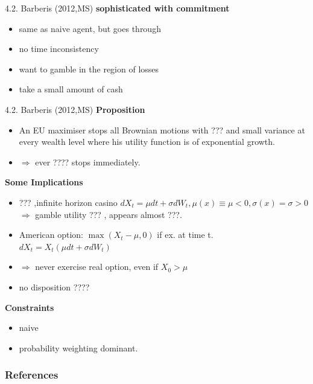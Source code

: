 \documentclass[11pt, aspectratio=169]{beamer}
\begin{document}
\begin{frame}{4.2. Barberis (2012,MS)}
    \textbf{sophisticated with commitment}
    \begin{itemize}
        \item same as naive agent, but goes through \medskip
        \item no time inconsistency \medskip
        \item want to gamble in the region of losses\\
        \item take a small amount of cash
    \end{itemize}
\end{frame}

\begin{frame}{4.2. Barberis (2012,MS)}
    \textbf{Proposition}    
    \begin{itemize}
        \item An EU maximiser stops all Brownian motions with  ??? and small variance at every wealth level where his utility function is of exponential growth.\\ 
        \item $\Rightarrow$ ever ???? stops immediately.\\
    \end{itemize}
    \textbf{Some Implications}    
    \begin{itemize}
        \item ??? ,infinite horizon casino \medskip
        $dX_t=\mu dt+ \sigma dW_t, \mu(x)\equiv \mu <0, \sigma(x)=\sigma >0 $\\
        $\Rightarrow $ gamble utility ??? , appears almost  ???.\\
        \item American option: $\max (X_t-\mu, 0)$ if ex. at time t.\\
        $dX_t=X_t(\mu dt+ \sigma dW_t) $
        \item $\Rightarrow $ never exercise real option, even if $X_0 > \mu$ \medskip
        \item no disposition ????
    \end{itemize}
    \textbf{Constraints}  
    \begin{itemize}
        \item naive \medskip
        \item probability weighting dominant. \medskip
    \end{itemize}
\end{frame}




\begin{frame}[allowframebreaks]
    \frametitle{References}
    \renewcommand{\bibfont}{\normalfont\footnotesize}
    \printbibliography
\end{frame}
\end{document}

